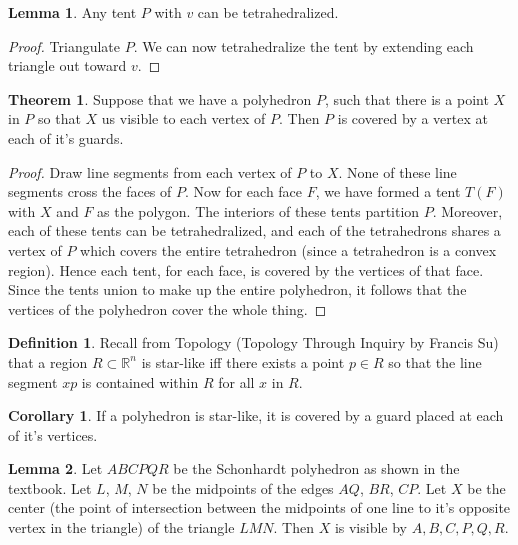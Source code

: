 \documentclass[12pt]{article}
\newcommand{\R}{\mathbb{R}}
\theoremstyle{definition}
\newtheorem*{definition}{Definition}
\newtheorem{lemma}{Lemma}
\newtheorem{theorem}{Theorem}
\newtheorem{corollary}{Corollary}
\begin{document}
\begin{lemma}
Any tent $P$ with $v$ can be tetrahedralized.
\end{lemma}

\begin{proof}
Triangulate $P$. We can now tetrahedralize the tent by extending each triangle out toward $v$. 
\end{proof}

\begin{theorem}
Suppose that we have a polyhedron $P$, such that there is a point $X$ in $P$ so that $X$ us visible to each vertex of $P$. Then $P$ is covered by a vertex at each of it's guards. 
\end{theorem}

\begin{proof}
Draw line segments from each vertex of $P$ to $X$. None of these line segments cross the faces of $P$. Now for each face $F$, we have formed a tent $T(F)$ with $X$ and $F$ as the polygon. The interiors of these tents partition $P$. Moreover, each of these tents can be tetrahedralized, and each of the tetrahedrons shares a vertex of $P$ which covers the entire tetrahedron (since a tetrahedron is a convex region). Hence each tent, for each face, is covered by the vertices of that face. Since the tents union to make up the entire polyhedron, it follows that the vertices of the polyhedron cover the whole thing.
\end{proof}

\begin{definition}
Recall from Topology (Topology Through Inquiry by Francis Su) that a region $R\subset \R^n$ is star-like iff there exists a point $p\in R$ so that the line segment $xp$ is contained within $R$ for all $x$ in $R$. 
\end{definition}

\begin{corollary}
If a polyhedron is star-like, it is covered by a guard placed at each of it's vertices.
\end{corollary}

\begin{lemma}
Let $ABCPQR$ be the Schonhardt polyhedron as shown in the textbook. Let $L$, $M$, $N$ be the midpoints of the edges $AQ$, $BR$, $CP$. Let $X$ be the center (the point of intersection between the midpoints of one line to it's opposite vertex in the triangle) of the triangle $LMN$. Then $X$ is visible by $A,B,C,P,Q,R$. 
\end{lemma}
\end{document}
